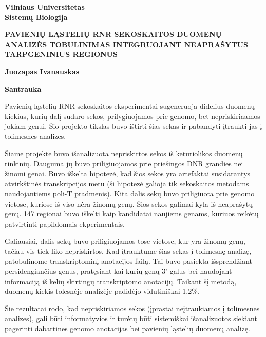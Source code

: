 \begin{center}
    \textbf{Vilniaus Universitetas} \\
    \textbf{Sistemų Biologija} \\
    
    \vspace{0.5cm}
    
    \textbf{PAVIENIŲ LĄSTELIŲ RNR SEKOSKAITOS DUOMENŲ ANALIZĖS TOBULINIMAS INTEGRUOJANT NEAPRAŠYTUS TARPGENINIUS REGIONUS} \\
    
    \vspace{1cm}
    
    \textbf{Juozapas Ivanauskas} \\
    
    \vspace{1cm}
    
    \textbf{Santrauka} \\
    
\end{center}

Pavienių ląstelių RNR sekoskaitos eksperimentai sugeneruoja didelius duomenų kiekius, kurių dalį sudaro sekos, prilygiuojamos prie genomo,
bet nepriskiriaamos jokiam genui.
Šio projekto tikslas buvo ištirti šias sekas ir pabandyti įtraukti jas į tolimesnes analizes.

Šiame projekte buvo išanalizuota nepriskirtos sekos iš keturiolikos duomenų rinkinių.
Dauguma jų buvo priligiuojamos prie priešingos DNR grandies nei žinomi genai.
Buvo iškelta hipotezė, kad šios sekos yra artefaktai susidarantys atvirkštinės transkripcijos metu
(ši hipotezė galioja tik sekoskaitos metodams naudojantiems poli-T pradmenis).
Kita dalis sekų buvo priligiuota prie genomo vietose, kuriose iš viso nėra žinomų genų.
Šios sekos galimai kyla iš neaprašytų genų.
147 regionai buvo iškelti kaip kandidatai naujiems genams, kuriuos reikėtų patvirtinti papildomais ekperimentais.

Galiausiai, dalis sekų buvo priligiuojamos tose vietose, kur yra žinomų genų, tačiau vis tiek liko nepriskirtos.
Kad įtrauktume šias sekas į tolimesnę analizę, patobulinome transkriptominį anotacijos failą.
Tai buvo pasiekta išsprendžiant persidengiančius genus,
pratęsiant kai kurių genų 3' galus bei naudojant informaciją iš kelių skirtingų transkriptomo anotacijų.
Taikant šį metodą, duomenų kiekis tolesnėje analizėje padidėjo vidutiniškai 1.2\%.

Šie rezultatai rodo, kad nepriskiriamos sekos (įprastai neįtraukiamos į tolimesnes analizes), gali būti informatyvios ir
turėtų būti sistemiškai išanalizuotos siekiant pagerinti dabartines genomo anotacijas bei pavienių ląstelių duomenų analizę.
